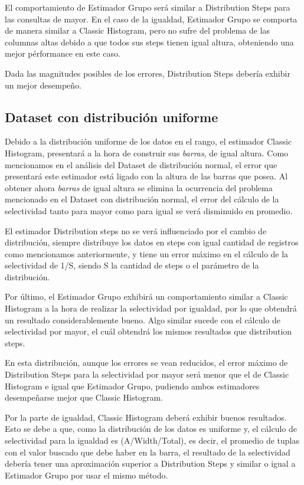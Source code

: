 \documentclass[a4paper, 10pt, twoside]{article}
\begin{document}
El comportamiento de Estimador Grupo será similar a Distribution Steps para las consultas de mayor. En el caso de la igualdad, Estimador Grupo se comporta de manera similar a Classic Histogram, pero no sufre del problema de las columnas altas debido a que todos sus steps tienen igual altura, obteniendo una mejor pérformance en este caso.

Dada las magnitudes posibles de los errores, Distribution Steps debería exhibir un mejor desempeño.

\subsection{Dataset con distribución uniforme}

Debido a la distribución uniforme de los datos en el rango, el estimador Classic Histogram, presentará a la hora de construir sus \textit{barras}, de igual altura. Como mencionamos en el análisis del Dataset de distribución normal, el error que presentará este estimador está ligado con la altura de las barras que posea. Al obtener ahora \textit{barras} de igual altura se elimina la ocurrencia del problema mencionado en el Dataset con distribución normal, el error del cálculo de la selectividad tanto para mayor como para igual se verá disminuido en promedio. 

El estimador Distribution steps no se verá influenciado por el cambio de distribución, siempre distribuye los datos en steps con igual cantidad de registros como mencionamos anteriormente, y tiene un error máximo en el cálculo de la selectividad de 1/S, siendo S la cantidad de steps o el parámetro de la distribución.

Por último, el Estimador Grupo exhibirá un comportamiento similar a Classic Histogram a la hora de realizar la selectividad por igualdad, por lo que obtendrá un resultado considerablemente bueno. Algo similar sucede con el cálculo de selectividad por mayor, el cuál obtendrá los mismos resultados que distribution steps.

En esta distribución, aunque los errores se vean reducidos, el error máximo de Distribution Steps para la selectividad por mayor será menor que el de Classic Histogram e igual que Estimador Grupo, pudiendo ambos estimadores desempeñarse mejor que Classic Histogram.

Por la parte de igualdad, Classic Histogram deberá exhibir buenos resultados. Esto se debe a que, como la distribución de los datos es uniforme y, el cálculo de selectividad para la igualdad es (A/Width/Total), es decir, el promedio de tuplas con el valor buscado que debe haber en la barra, el resultado de la selectividad debería tener una aproximación superior a Distribution Steps y similar o igual a Estimador Grupo por usar el mismo método.
\end{document}
